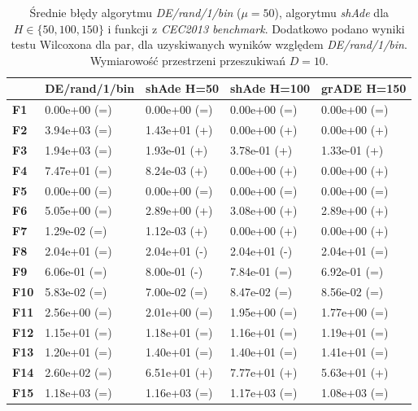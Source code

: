 \documentclass[12pt,a4paper]{report}
\begin{document}
{{{{{{{\begin{table}[h]
\centering
\caption{Średnie błędy algorytmu \emph{DE/rand/1/bin} ($\mu = 50$), algorytmu \emph{shAde} dla $H \in \{50, 100, 150\}$ i funkcji z \emph{CEC2013 benchmark}. Dodatkowo podano wyniki testu Wilcoxona dla par, dla uzyskiwanych wyników względem \emph{DE/rand/1/bin}. Wymiarowość przestrzeni przeszukiwań $D = 10$.}
\label{Anal16}
\begin{tabular}{|l|l|l|l|l|}
\hline
          & {\bf DE/rand/1/bin} & {\bf shAde H=50} & {\bf shAde H=100} & {\bf grADE H=150} \\ \hline
{\bf F1}  & 0.00e+00 (=)        & 0.00e+00 (=)     & 0.00e+00 (=)      & 0.00e+00 (=)      \\ \hline
{\bf F2}  & 3.94e+03 (=)        & 1.43e+01 (+)     & 0.00e+00 (+)      & 0.00e+00 (+)      \\ \hline
{\bf F3}  & 1.94e+03 (=)        & 1.93e-01 (+)     & 3.78e-01 (+)      & 1.33e-01 (+)      \\ \hline
{\bf F4}  & 7.47e+01 (=)        & 8.24e-03 (+)     & 0.00e+00 (+)      & 0.00e+00 (+)      \\ \hline
{\bf F5}  & 0.00e+00 (=)        & 0.00e+00 (=)     & 0.00e+00 (=)      & 0.00e+00 (=)      \\ \hline
{\bf F6}  & 5.05e+00 (=)        & 2.89e+00 (+)     & 3.08e+00 (+)      & 2.89e+00 (+)      \\ \hline
{\bf F7}  & 1.29e-02 (=)        & 1.12e-03 (+)     & 0.00e+00 (+)      & 0.00e+00 (+)      \\ \hline
{\bf F8}  & 2.04e+01 (=)        & 2.04e+01 (-)     & 2.04e+01 (-)      & 2.04e+01 (=)      \\ \hline
{\bf F9}  & 6.06e-01 (=)        & 8.00e-01 (-)     & 7.84e-01 (=)      & 6.92e-01 (=)      \\ \hline
{\bf F10} & 5.83e-02 (=)        & 7.00e-02 (=)     & 8.47e-02 (=)      & 8.56e-02 (=)      \\ \hline
{\bf F11} & 2.56e+00 (=)        & 2.01e+00 (=)     & 1.95e+00 (=)      & 1.77e+00 (=)      \\ \hline
{\bf F12} & 1.15e+01 (=)        & 1.18e+01 (=)     & 1.16e+01 (=)      & 1.19e+01 (=)      \\ \hline
{\bf F13} & 1.20e+01 (=)        & 1.40e+01 (=)     & 1.40e+01 (=)      & 1.41e+01 (=)      \\ \hline
{\bf F14} & 2.60e+02 (=)        & 6.51e+01 (+)     & 7.77e+01 (+)      & 5.63e+01 (+)      \\ \hline
{\bf F15} & 1.18e+03 (=)        & 1.16e+03 (=)     & 1.17e+03 (=)      & 1.08e+03 (=)      \\ \hline

\end{tabular}
\end{table}}}}}}}}
\end{document}
